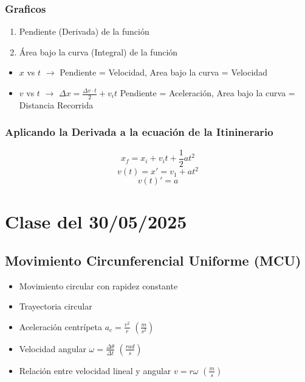 \documentclass[11pt]{article}
\begin{document}
        \subsubsection{Graficos}
        \begin{enumerate}
            \item Pendiente (Derivada) de la función
            \item Área bajo la curva (Integral) de la función
        \end{enumerate}
            \begin{itemize}
                \item $x$ vs $t$ $\rightarrow$ Pendiente = Velocidad, Area bajo la curva = Velocidad
                \item $v$ vs $t$ $\rightarrow$ $\Delta{x}=\frac{\Delta{v} \cdot t}{2}+v_i t$ Pendiente = Aceleración, Area bajo la curva = Distancia Recorrida
            \end{itemize}

        \subsubsection{Aplicando la Derivada a la ecuación de la Itininerario}
            \[x_f=x_i+v_i t+\frac{1}{2}at^2 \]
            \[v(t)=x'=v_1+at^2 \]
            \[v(t)'=a \]




\section{Clase del 30/05/2025}
    \subsection{Movimiento Circunferencial Uniforme (MCU)}
        \begin{itemize}
            \item Movimiento circular con rapidez constante
            \item Trayectoria circular
            \item Aceleración centrípeta $a_c = \frac{v^2}{r}$ $(\frac{m}{s^2})$
            \item Velocidad angular $\omega = \frac{\Delta \theta}{\Delta t}$ $(\frac{rad}{s})$
            \item Relación entre velocidad lineal y angular $v = r\omega$ $(\frac{m}{s})$
        \end{itemize}
\end{document}
